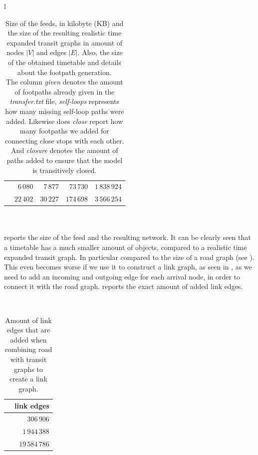 \begin{table}[ht]
\begin{center}
\begin{tabular}{l}
\begin{tabular}{|l||r|r|r|r|}
				\stuttgartR		&$6\,080$	&$7\,877$		&$73\,730$		&$1\,838\,924$\\
				\switzerlandR	&$22\,402$	&$30\,227$		&$174\,698$		&$3\,566\,254$\\\hline
			\end{tabular}
			\end{tabular}
		\end{center}
		\caption{Size of the \gtfs feeds, in kilobyte (KB) and the size of the resulting realistic time expanded transit graphs
			in amount of nodes $|V|$ and edges $|E|$. Also, the size of the obtained timetable and details about the
			footpath generation.\\
			The column \textit{given} denotes the amount of footpaths already given in the \textit{transfer.txt} file,
			\textit{self-loops} represents how many missing self-loop paths were added. Likewise does \textit{close} report how
			many footpaths we added for connecting close stops with each other. And \textit{closure} denotes
			the amount of paths added to ensure that the model is transitively closed.}
		\label{gtfsSize}
	\end{table}\quad\\\\
	 reports the size of the feed and the resulting network. It can be clearly seen that a timetable has a
	much smaller amount of objects, compared to a realistic time expanded transit graph. In particular compared to the size of a
	road graph (see ). This even becomes worse if we use it to construct a link graph, as seen in ,
	as we need to add an incoming and outgoing edge for each arrival node, in order to connect it with the road graph. 
	reports the exact amount of added link edges.
	\begin{table}[ht]
	 	\begin{center}
	 		\phantom{v}\quad\\
			\begin{tabular}{|l||r|}
				\hline
							&\multicolumn{1}{c|}{link edges}\\\hline
				\freiburgR		&$306\,906$\\
				\stuttgartR		&$1\,944\,388$\\
				\switzerlandR	&$19\,584\,786$\\\hline
			\end{tabular}
		\end{center}
		\caption{Amount of link edges that are added when combining road with transit graphs to create a link graph.}
		\label{linkGraphSize}
	\end{table}\quad\\\\


